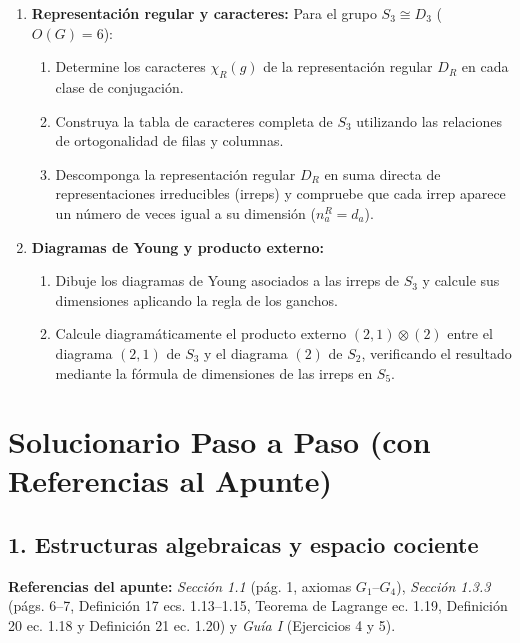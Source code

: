 \documentclass[11pt, a4paper]{article}
\begin{document}
\begin{enumerate}[label=\textbf{\arabic*.}]
    \item \textbf{Representación regular y caracteres:}
    Para el grupo $S_3 \cong D_3$ ($O(G) = 6$):
    \begin{enumerate}[label=\alph*)]
        \item Determine los caracteres $\chi_R(g)$ de la representación regular $D_R$ en cada clase de conjugación.
        \item Construya la tabla de caracteres completa de $S_3$ utilizando las relaciones de ortogonalidad de filas y columnas.
        \item Descomponga la representación regular $D_R$ en suma directa de representaciones irreducibles (irreps) y compruebe que cada irrep aparece un número de veces igual a su dimensión ($n_a^R = d_a$).
    \end{enumerate}

    \item \textbf{Diagramas de Young y producto externo:}
    \begin{enumerate}[label=\alph*)]
        \item Dibuje los diagramas de Young asociados a las irreps de $S_3$ y calcule sus dimensiones aplicando la regla de los ganchos.
        \item Calcule diagramáticamente el producto externo $(2,1) \otimes (2)$ entre el diagrama $(2,1)$ de $S_3$ y el diagrama $(2)$ de $S_2$, verificando el resultado mediante la fórmula de dimensiones de las irreps en $S_5$.
    \end{enumerate}
\end{enumerate}

\newpage

\section*{Solucionario Paso a Paso (con Referencias al Apunte)}

\subsection*{1. Estructuras algebraicas y espacio cociente}
\textbf{Referencias del apunte:} \textit{Sección 1.1} (pág. 1, axiomas $G_1$--$G_4$), \textit{Sección 1.3.3} (págs. 6--7, Definición 17 ecs. 1.13--1.15, Teorema de Lagrange ec. 1.19, Definición 20 ec. 1.18 y Definición 21 ec. 1.20) y \textit{Guía I} (Ejercicios 4 y 5).
\end{document}

